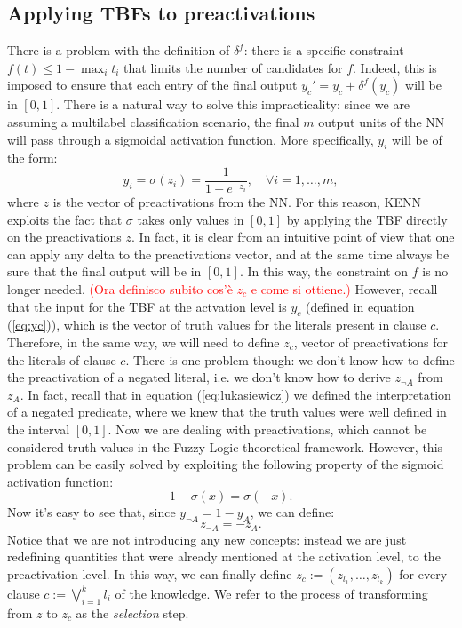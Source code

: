 \subsection{Applying TBFs to preactivations} 
\label{sec:tbf_preac}
There is a problem with the definition of $\delta^f$: there is a specific constraint $f(t) \leq 1 - \max_i t_i$ that limits the number of candidates for $f$. Indeed, this is imposed to ensure that \textcolor{unipd}{each entry of} the final output $y_c'= y_c + \delta^f(y_c)$ will be in $\left[0,1\right]$. There is a natural way to solve this impracticality: since we are assuming a multilabel classification scenario, the final $m$ output units of the NN will pass through a sigmoidal activation function. More specifically, $y_i$ will be of the form:
\begin{equation*}
y_i = \sigma(z_i) = \frac{1}{1+e^{-z_i}}, \quad \forall i=1,\dots,m,
\end{equation*}
\textcolor{unipd}{where $z$ is the vector of preactivations from the NN.} For this reason, KENN exploits the fact that $\sigma$ takes only values in $\left[0,1\right]$ by applying the TBF directly on the preactivations $z$. In fact, it is clear from an intuitive point of view that one can apply any delta to the preactivations vector, and at the same time always be sure that the final output will be in $\left[0,1\right]$. In this way, the constraint on $f$ is no longer needed. 
\textcolor{red}{(Ora definisco subito cos'è $z_c$ e come si ottiene.)}
\textcolor{unipd}{However, recall that the input for the TBF at the actvation level is $y_c$ (defined in equation (\ref{eq:yc})), which is the vector of truth values for the literals present in clause $c$. Therefore, in the same way, we will need to define $z_c$, vector of preactivations for the literals of clause $c$. There is one problem though: we don't know how to define the preactivation of a negated literal, i.e. we don't know how to derive $z_{\neg A}$ from $z_A$. In fact, recall that in equation (\ref{eq:lukasiewicz}) we defined the interpretation of a negated predicate, where we knew that the truth values were well defined in the interval $\left[0,1\right]$. Now we are dealing with preactivations, which cannot be considered truth values in the Fuzzy Logic theoretical framework. However, this problem can be easily solved by exploiting the following property of the sigmoid activation function:
	\begin{equation*}
	1 - \sigma(x) = \sigma(-x).
	\end{equation*}
	Now it's easy to see that, since $y_{\neg A} = 1 - y_A$, we can define:
	\begin{equation*}
	z_{\neg A} = -z_A.
	\end{equation*}
	Notice that we are not introducing any new concepts: instead we are just redefining quantities that were already mentioned at the activation level, to the preactivation level.
	In this way, we can finally define $z_c := \left(z_{l_1}, \dots, z_{l_k}\right)$ for every clause $c := \bigvee_{i=1}^k l_i$ of the knowledge. We refer to the process of transforming from $z$ to $z_c$ as the \textit{selection} step.}

